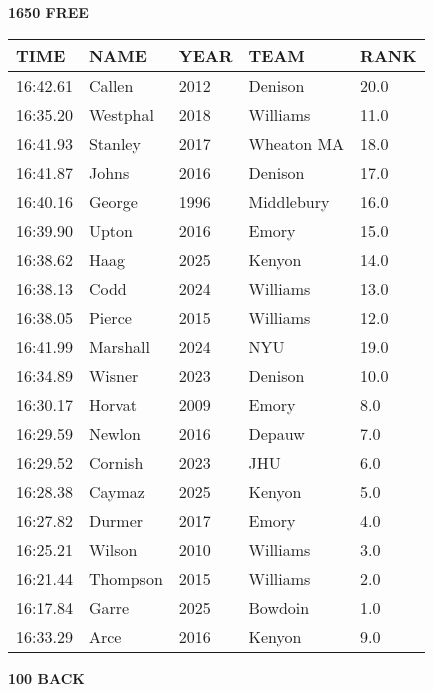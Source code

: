 \begin{table}[H]
\centering
\begin{minipage}[t]{0.48\textwidth}
\centering
\textbf{1650 FREE}\\[0.1cm]
\begin{tabular}{@{}p{1.8cm}p{2.8cm}p{1.2cm}p{1.4cm}p{0.8cm}@{}}
\hline
    \textbf{TIME} & \textbf{NAME} & \textbf{YEAR} & \textbf{TEAM} & \textbf{RANK} \\
\hline
    16:42.61 & Callen & 2012 & Denison & 20.0 \\
    16:35.20 & Westphal & 2018 & Williams & 11.0 \\
    16:41.93 & Stanley & 2017 & Wheaton MA & 18.0 \\
    16:41.87 & Johns & 2016 & Denison & 17.0 \\
    16:40.16 & George & 1996 & Middlebury & 16.0 \\
    16:39.90 & Upton & 2016 & Emory & 15.0 \\
    16:38.62 & Haag & 2025 & Kenyon & 14.0 \\
    16:38.13 & Codd & 2024 & Williams & 13.0 \\
    16:38.05 & Pierce & 2015 & Williams & 12.0 \\
    16:41.99 & Marshall & 2024 & NYU & 19.0 \\
    16:34.89 & Wisner & 2023 & Denison & 10.0 \\
    16:30.17 & Horvat & 2009 & Emory & 8.0 \\
    16:29.59 & Newlon & 2016 & Depauw & 7.0 \\
    16:29.52 & Cornish & 2023 & JHU & 6.0 \\
    16:28.38 & Caymaz & 2025 & Kenyon & 5.0 \\
    16:27.82 & Durmer & 2017 & Emory & 4.0 \\
    16:25.21 & Wilson & 2010 & Williams & 3.0 \\
    16:21.44 & Thompson & 2015 & Williams & 2.0 \\
    16:17.84 & Garre & 2025 & Bowdoin & 1.0 \\
    16:33.29 & Arce & 2016 & Kenyon & 9.0 \\
\hline
\end{tabular}
\end{minipage}\hfill
\begin{minipage}[t]{0.48\textwidth}
\centering
\textbf{100 BACK}\\[0.1cm]
\begin{tabular}{@{}p{1.8cm}p{2.8cm}p{1.2cm}p{1.4cm}p{0.8cm}@{}}

\end{tabular}
\end{minipage}
\end{table}
